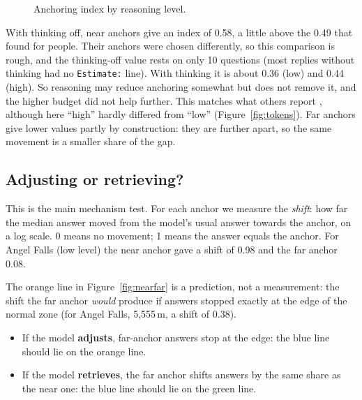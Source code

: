 \documentclass[11pt,a4paper]{article}
\begin{document}
\begin{figure}[ht]
\centering
{}
\caption{Anchoring index by reasoning level.}
\label{fig:index}
\end{figure}

With thinking off, near anchors give an index of 0.58, a little above the 0.49 that \citet{jacowitz1995measures} found for people. Their anchors were chosen differently, so this comparison is rough, and the thinking-off value rests on only 10 questions (most replies without thinking had no \texttt{Estimate:} line). With thinking it is about 0.36 (low) and 0.44 (high). So reasoning may reduce anchoring somewhat but does not remove it, and the higher budget did not help further. This matches what others report \citep{kraishan2026long}, although here \enquote{high} hardly differed from \enquote{low} (Figure~\ref{fig:tokens}). Far anchors give lower values partly by construction: they are further apart, so the same movement is a smaller share of the gap.

\subsection{Adjusting or retrieving?}

This is the main mechanism test. For each anchor we measure the \emph{shift}: how far the median answer moved from the model's usual answer towards the anchor, on a log scale. 0 means no movement; 1 means the answer equals the anchor. For Angel Falls (low level) the near anchor gave a shift of 0.98 and the far anchor 0.08.

The orange line in Figure~\ref{fig:nearfar} is a prediction, not a measurement: the shift the far anchor \emph{would} produce if answers stopped exactly at the edge of the normal zone (for Angel Falls, 5,555\,m, a shift of 0.38).
\begin{itemize}
  \item If the model \textbf{adjusts}, far-anchor answers stop at the edge: the blue line should lie on the orange line.
  \item If the model \textbf{retrieves}, the far anchor shifts answers by the same share as the near one: the blue line should lie on the green line.
\end{itemize}
\end{document}
